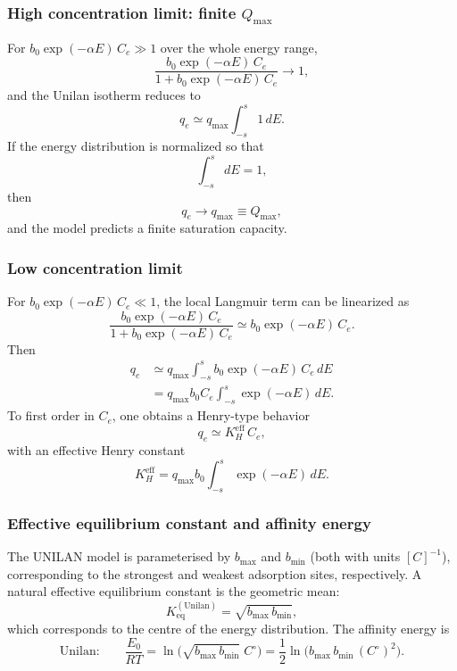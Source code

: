 \documentclass[12pt]{article}
\begin{document}
	\subsubsection{High concentration limit: finite $Q_{\max}$}
	
	For $b_0 \exp(-\alpha E)\, C_e \gg 1$ over the whole energy range,
	\[
	\frac{b_0 \exp(-\alpha E)\, C_e}{1 + b_0 \exp(-\alpha E)\, C_e} \to 1,
	\]
	and the Unilan isotherm reduces to
	\begin{equation}
		q_e \simeq q_{\max} \int_{-s}^{s} 1 \, dE.
	\end{equation}
	If the energy distribution is normalized so that
	\[
	\int_{-s}^{s} dE = 1,
	\]
	then
	\begin{equation}
		q_e \to q_{\max} \equiv Q_{\max},
	\end{equation}
	and the model predicts a finite saturation capacity.
	
	\subsubsection{Low concentration limit}
	
	For $b_0 \exp(-\alpha E)\, C_e \ll 1$, the local Langmuir term can be
	linearized as
	\[
	\frac{b_0 \exp(-\alpha E)\, C_e}{1 + b_0 \exp(-\alpha E)\, C_e}
	\simeq b_0 \exp(-\alpha E)\, C_e.
	\]
	Then
	\begin{align}
		q_e
		&\simeq q_{\max} \int_{-s}^{s} b_0 \exp(-\alpha E)\, C_e \, dE \nonumber \\
		&= q_{\max} b_0 C_e \int_{-s}^{s} \exp(-\alpha E)\, dE.
	\end{align}
	To first order in $C_e$, one obtains a Henry-type behavior
	\begin{equation}
		q_e \simeq K_H^{\mathrm{eff}}\, C_e,
	\end{equation}
	with an effective Henry constant
	\begin{equation}
		K_H^{\mathrm{eff}} = q_{\max} b_0 \int_{-s}^{s} \exp(-\alpha E)\, dE.
	\end{equation}

	\subsubsection{Effective equilibrium constant and affinity energy}

	The UNILAN model is parameterised by $b_{\max}$ and $b_{\min}$ (both
	with units $[C]^{-1}$), corresponding to the strongest and weakest
	adsorption sites, respectively. A natural effective equilibrium constant
	is the geometric mean:
	\begin{equation}
		K_{\mathrm{eq}}^{\mathrm{(Unilan)}}
		= \sqrt{b_{\max}\, b_{\min}},
	\end{equation}
	which corresponds to the centre of the energy distribution. The
	affinity energy is
	\begin{equation}
		\text{Unilan:}\qquad
		\frac{E_0}{RT}
		= \ln\!\bigl(\sqrt{b_{\max}\,b_{\min}}\; C^\circ\bigr)
		= \frac{1}{2}
		\ln\!\bigl(b_{\max}\,b_{\min}\,(C^\circ)^{2}\bigr).
		\label{eq:E_unilan}
	\end{equation}
\end{document}
